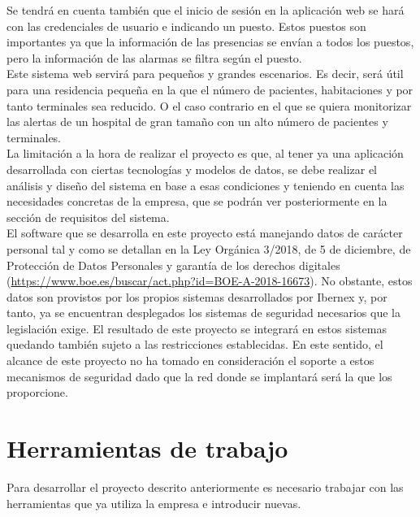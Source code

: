Se tendrá en cuenta también que el inicio de sesión en la aplicación web se hará con las credenciales de usuario e indicando un puesto. Estos puestos son importantes ya que la información de las presencias se envían a todos los puestos, pero la información de las alarmas se filtra según el puesto.\\

Este sistema web servirá para pequeños y grandes escenarios. Es decir, será útil para una residencia pequeña en la que el número de pacientes, habitaciones y por tanto terminales sea reducido. O el caso contrario en el que se quiera monitorizar las alertas de un hospital de gran tamaño con un alto número de pacientes y terminales.\\


La limitación a la hora de realizar el proyecto es que, al tener ya una aplicación desarrollada con ciertas tecnologías y modelos de datos, se debe realizar el análisis y diseño del sistema en base a esas condiciones y teniendo en cuenta las necesidades concretas de la empresa, que se podrán ver posteriormente en la sección de requisitos del sistema. \\

El software que se desarrolla en este proyecto está manejando datos de carácter personal tal y como se detallan en la Ley Orgánica 3/2018, de 5 de diciembre, de Protección de Datos Personales y garantía de los derechos digitales (\url{https://www.boe.es/buscar/act.php?id=BOE-A-2018-16673}). No obstante, estos datos son provistos por los propios sistemas desarrollados por Ibernex y, por tanto, ya se encuentran desplegados los sistemas de seguridad necesarios que la legislación exige. El resultado de este proyecto se integrará en estos sistemas quedando también sujeto a las restricciones establecidas. En este sentido, el alcance de este proyecto no ha tomado en consideración el soporte a estos mecanismos de seguridad dado que la red donde se implantará será la que los proporcione.


\section{Herramientas de trabajo}


Para desarrollar el proyecto descrito anteriormente es necesario trabajar con las herramientas que ya utiliza la empresa e introducir nuevas.

